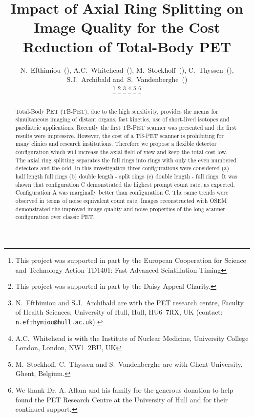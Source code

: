 \documentclass[journal]{IEEEtran}
\begin{document}
\title{Impact of Axial Ring Splitting on Image Quality for the Cost Reduction of Total-Body PET}
\author{N.~Efthimiou~(),
        A.C.~Whitehead~(),
        M.~Stockhoff~(), 
        C.~Thyssen~(),
        S.J.~Archibald
        and~S.~Vandenberghe~()%
        
        \thanks{This project was supported in part by the European Cooperation for Science and Technology Action TD1401: Fast Advanced Scintillation Timing}%
        \thanks{This project was supported in part by the Daisy Appeal Charity.}%
        \thanks{N.~Efthimiou and S.J.~Archibald are with the PET research centre, Faculty of Health Sciences, University of Hull, Hull, HU6~7RX, UK (contact: \texttt{n.efthymiou@hull.ac.uk}).}%
        \thanks{A.C.~Whitehead is with the Institute of Nuclear Medicine, University College London, London, NW1~2BU, UK}%
        \thanks{M.~Stockhoff, C.~Thyssen  and S.~Vandenberghe are with Ghent University, Ghent, Belgium.}%
        \thanks{We thank Dr. A. Allam and his family for the generous donation to help found the PET Research Centre at the University of Hull and for their continued support.}}%

\maketitle
\vspace{-1cm}
    
\IEEEpeerreviewmaketitle
\begin{abstract}
Total-Body PET (TB-PET), due to the high sensitivity, provides the means for simultaneous imaging of distant organs, fast kinetics, use of short-lived isotopes and paediatric applications. Recently the first TB-PET scanner was presented and the first results were impressive. However, the cost of a TB-PET scanner is prohibiting for many clinics and research institutions. Therefore we propose a flexible detector configuration which will increase the axial field of view and keep the total cost low. The axial ring splitting separates the full rings into rings with only the even numbered detectors and the odd. In this investigation three configurations were considered (a) half length full rings (b) double length - split rings (c) double length - full rings. It was shown that configuration C demonstrated the highest prompt count rate, as expected. Configuration A was marginally better than configuration C. The same trends were observed in terms of noise equivalent count rate. Images reconstructed with OSEM demonstrated the improved image quality and noise properties of the long scanner configuration over classic PET. 
\end{abstract}
    
\end{document}
